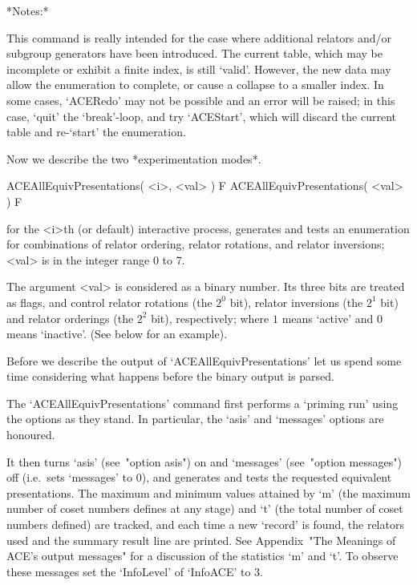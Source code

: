 *Notes:*

This command is really intended for the case where additional relators
and/or subgroup generators have been introduced.  The  current  table,
which  may  be  incomplete  or  exhibit  a  finite  index,  is   still
\lq{}valid'. However, the  new  data  may  allow  the  enumeration  to
complete, or cause a collapse to  a  smaller  index.  In  some  cases,
`ACERedo' may not be possible and an error will  be  raised;  in  this
case, `quit' the `break'-loop, and try `ACEStart', which will  discard
the current table and re-\lq{}start' the enumeration.

Now we describe the two *experimentation modes*.

\>ACEAllEquivPresentations( <i>, <val> ) F
\>ACEAllEquivPresentations( <val> ) F

for the <i>th (or default) interactive {\ACE} process,  generates  and
tests an enumeration for combinations  of  relator  ordering,  relator
rotations, and relator inversions; <val> is in the integer range 0  to
7.

The argument <val> is considered as a binary number.  Its  three  bits
are treated as flags, and control relator rotations (the  $2^0$  bit),
relator inversions (the $2^1$ bit) and relator  orderings  (the  $2^2$
bit),  respectively;  where  $1$  means  \lq{}active'  and  $0$  means
\lq{}inactive'. (See below for an example).

Before we describe the {\GAP} output of `ACEAllEquivPresentations' let
us spend some time considering what happens before the  {\ACE}  binary
output is parsed.

The `ACEAllEquivPresentations' command first performs  a  \lq{}priming
run' using the options as they stand. In particular,  the  `asis'  and
`messages' options are honoured.

It  then  turns  `asis'  (see~"option   asis")   on   and   `messages'
(see~"option messages") off (i.e.~sets `messages' to 0), and generates
and tests the requested  equivalent  presentations.  The  maximum  and
minimum values attained by `m' (the maximum number  of  coset  numbers
defines at any stage) and `t'  (the  total  number  of  coset  numbers
defined) are tracked, and each time a new \lq{}record' is  found,  the
relators  used  and  the  summary  result  line   are   printed.   See
Appendix~"The Meanings of ACE's output messages" for a  discussion  of
the statistics  `m'  and  `t'.  To  observe  these  messages  set  the
`InfoLevel' of `InfoACE' to 3.

